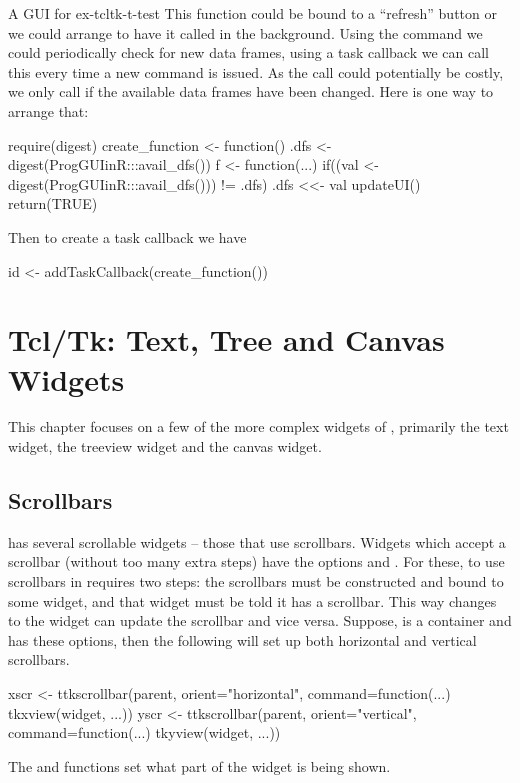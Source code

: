 \begin{example}{A GUI for }{ex-tcltk-t-test}
This function could be bound to a ``refresh'' button or we could
arrange to have it called in the background. Using the 
command we could periodically check for new data frames, using a
task callback we can call this every time a
new command is issued.  As the call could potentially be costly, we
only call if the available data frames have been changed. Here is one
way to arrange that:
\begin{Schunk}
\begin{Sinput}
 require(digest)
 create_function <- function() {
   .dfs <- digest(ProgGUIinR:::avail_dfs())
   f <- function(...) {
     if((val <- digest(ProgGUIinR:::avail_dfs())) != .dfs) {
       .dfs <<- val
       updateUI()
     }
     return(TRUE)
   }
 }
\end{Sinput}
\end{Schunk}
Then to create a task callback we have
\begin{Schunk}
\begin{Sinput}
 id <- addTaskCallback(create_function())
\end{Sinput}
\end{Schunk}

\end{example}


\chapter{Tcl/Tk: Text, Tree and Canvas Widgets}
\label{sec:tcltk:scrollable-widgets}
This chapter focuses on a few of the more complex widgets of \Tk,
primarily the text widget, the treeview widget and the canvas
widget.

\section{Scrollbars}
\label{sec:tcltk:scrollbars}

\TK\/ has several scrollable widgets -- those that use scrollbars.
Widgets which accept a scrollbar (without too many extra steps) have
the options  and .  For
these, to use scrollbars in  requires two steps: the
scrollbars must be constructed and bound to some widget, and that
widget must be told it has a scrollbar. This way changes to the widget
can update the scrollbar and vice versa. Suppose,  is a
container and  has these options, then the following will
set up both horizontal and vertical scrollbars.
%
\begin{Schunk}
\begin{Sinput}
 xscr <- ttkscrollbar(parent, orient="horizontal",
                  command=function(...) tkxview(widget, ...))
 yscr <- ttkscrollbar(parent, orient="vertical",
                  command=function(...) tkyview(widget, ...))
\end{Sinput}
\end{Schunk}
%
The  and  functions set what part of the widget is being shown.


